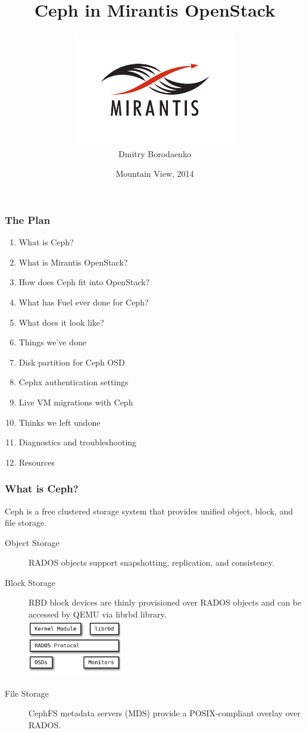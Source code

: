\documentclass[hyperref=unicode,utf8,xcolor=pst]{beamer}
\title{\fontsize{26}{0}\selectfont Ceph in Mirantis OpenStack}
\author{\vspace{-2.5mm}\includegraphics[height=5cm]{Vector_RGB_MirantisLogo}\\Dmitry Borodaenko}
\date{Mountain View, 2014}
\begin{document}
\begin{frame}
	\titlepage
\end{frame}

\begin{frame}
	\frametitle{The Plan}
	\begin{enumerate}
		\item What is Ceph?
		\item What is Mirantis OpenStack?
		\item How does Ceph fit into OpenStack?
		\item What has Fuel ever done for Ceph?
		\item What does it look like?
		\item Things we've done
		\item Disk partition for Ceph OSD
		\item Cephx authentication settings
		\item Live VM migrations with Ceph
		\item Thinks we left undone
		\item Diagnostics and troubleshooting
		\item Resources
	\end{enumerate}
\end{frame}

\begin{frame}
	\frametitle{What is Ceph?}
	Ceph is a free clustered storage system that provides unified
	object, block, and file storage.

	\begin{description}
		\item[Object Storage] RADOS objects support
			snapshotting, replication, and consistency.
		\item[Block Storage] RBD block devices are thinly
			provisioned over RADOS objects and can be
			accessed by QEMU via librbd library.\\
			\includegraphics[height=2.5cm]{ceph-rbd}
		\item[File Storage] CephFS metadata servers (MDS)
			provide a POSIX-compliant overlay over RADOS.
	\end{description}
\end{frame}
\end{document}
